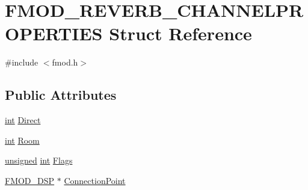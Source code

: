 \hypertarget{struct_f_m_o_d___r_e_v_e_r_b___c_h_a_n_n_e_l_p_r_o_p_e_r_t_i_e_s}{\section{F\-M\-O\-D\-\_\-\-R\-E\-V\-E\-R\-B\-\_\-\-C\-H\-A\-N\-N\-E\-L\-P\-R\-O\-P\-E\-R\-T\-I\-E\-S Struct Reference}
\label{struct_f_m_o_d___r_e_v_e_r_b___c_h_a_n_n_e_l_p_r_o_p_e_r_t_i_e_s}
}


{\ttfamily \#include $<$fmod.\-h$>$}

\subsection*{Public Attributes}
\begin{DoxyCompactItemize}
\item 
\hyperlink{wglew_8h_a500a82aecba06f4550f6849b8099ca21}{int} \hyperlink{struct_f_m_o_d___r_e_v_e_r_b___c_h_a_n_n_e_l_p_r_o_p_e_r_t_i_e_s_a4b8d70f2215d3170ef4d2d06db7a41bf}{Direct}
\item 
\hyperlink{wglew_8h_a500a82aecba06f4550f6849b8099ca21}{int} \hyperlink{struct_f_m_o_d___r_e_v_e_r_b___c_h_a_n_n_e_l_p_r_o_p_e_r_t_i_e_s_a4c5a73c7a00690a7e25d3b4ab50c6cc6}{Room}
\item 
\hyperlink{_free_image_8h_a425076c7067a1b5166e2cc530e914814}{unsigned} \hyperlink{wglew_8h_a500a82aecba06f4550f6849b8099ca21}{int} \hyperlink{struct_f_m_o_d___r_e_v_e_r_b___c_h_a_n_n_e_l_p_r_o_p_e_r_t_i_e_s_ac1b89e86a536121fc1c1d0602f7346d7}{Flags}
\item 
\hyperlink{fmod_8h_a2a546c1efce476d85cd8065d962d705d}{F\-M\-O\-D\-\_\-\-D\-S\-P} $\ast$ \hyperlink{struct_f_m_o_d___r_e_v_e_r_b___c_h_a_n_n_e_l_p_r_o_p_e_r_t_i_e_s_afa124f21c3035badddc2dabc008ec0c5}{Connection\-Point}
\end{DoxyCompactItemize}


